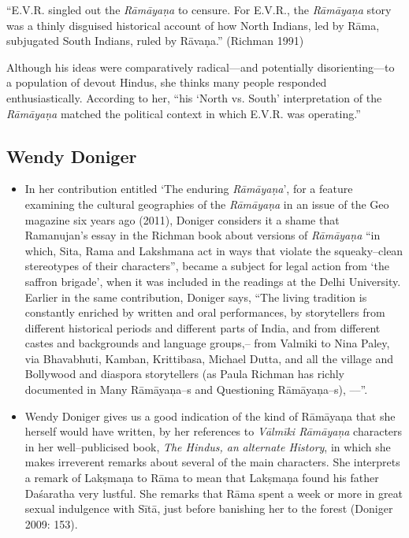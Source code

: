 \begin{myquote}
“E.V.R. singled out the \textit{Rāmāyaṇa} to censure. For E.V.R., the \textit{Rāmāyaṇa} story was a thinly disguised historical account of how North Indians, led by Rāma, subjugated South Indians, ruled by Rāvaṇa.” (Richman 1991)
\end{myquote}

Although his ideas were comparatively radical—and potentially disorienting—to a population of devout Hindus, she thinks many people responded enthusiastically. According to her, “his ‘North vs. South’ interpretation of the \textit{Rāmāyaṇa} matched the political context in which E.V.R. was operating.”

\newpage

\subsection*{Wendy Doniger}

\begin{itemize}
\item In her contribution entitled ‘The enduring \textit{Rāmāyaṇa}’, for a feature examining the cultural geographies of the \textit{Rāmāyaṇa} in an issue of the Geo magazine six years ago (2011), Doniger considers it a shame that Ramanujan’s essay in the Richman book about versions of \textit{Rāmāyaṇa} “in which, Sita, Rama and Lakshmana act in ways that violate the squeaky–clean stereotypes of their characters”, became a subject for legal action from ‘the saffron brigade’, when it was included in the readings at the Delhi University. Earlier in the same contribution, Doniger says, “The living tradition is constantly enriched by written and oral performances, by storytellers from different historical periods and different parts of India, and from different castes and backgrounds and language groups,– from Valmiki to Nina Paley, via Bhavabhuti, Kamban, Krittibasa, Michael Dutta, and all the village and Bollywood and diaspora storytellers (as Paula Richman has richly documented in Many Rāmāyaņa–s and Questioning Rāmāyaņa–s), ––”.

 \item Wendy Doniger gives us a good indication of the kind of Rāmāyaņa that she herself would have written, by her references to \textit{Vālmīki Rāmāyaņa} characters in her well–publicised book, \textit{The Hindus, an} \textit{alternate History}, in which she makes irreverent remarks about several of the main characters. She interprets a remark of Lakṣmaṇa to Rāma to mean that Lakṣmaṇa found his father Daśaratha very lustful. She remarks that Rāma spent a week or more in great sexual indulgence with Sītā, just before banishing her to the forest (Doniger 2009: 153).

\end{itemize}


